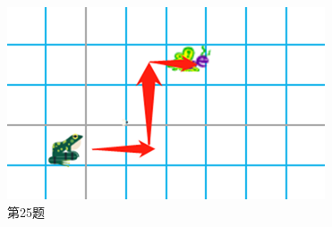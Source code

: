 \documentclass[10.5pt, a4paper]{article}
\begin{document}
    \begin{figure}[htbp]
        \centering
        \begin{minipage}[t]{.23\textwidth}
            \centering
            \includegraphics[width=\textwidth]{25.png}
            \caption*{第25题}
        \end{minipage}
        \begin{minipage}[t]{.23\textwidth}
            \centering
            \begin{minipage}[t]{.23\textwidth}
                \centering

\end{minipage}
\end{minipage}
\end{figure}
\end{document}
